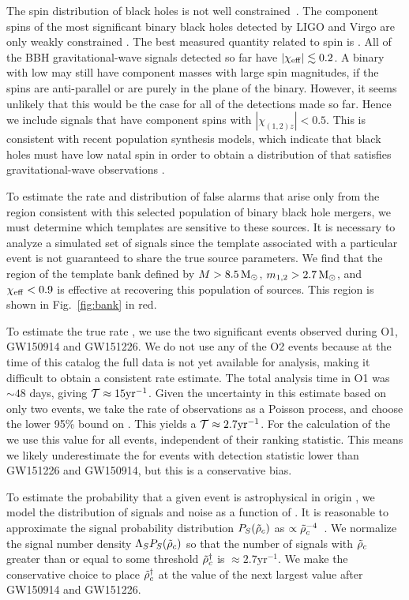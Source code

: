 The spin distribution of black holes is not well constrained~\citep{Reynolds:2013qqa}. The component spins
of the most significant binary black holes detected by LIGO and Virgo are
only weakly constrained \citep{TheLIGOScientific:2016pea}. The best measured
quantity related to spin is \chieff{}. All of the BBH gravitational-wave signals
detected so far have $|\chi_{\mathrm{eff}}| \lesssim 0.2$. A binary with
low \chieff{} may still have component masses with large spin magnitudes,
if the spins are anti-parallel or are purely in the plane of the binary.
However, it seems unlikely that this would be the case for all of the
detections made so far. Hence we include signals that have
component spins with $|\chi_{(1,2)z}| < 0.5$. This is consistent with
recent population synthesis models, which indicate that black holes
must have low natal spin in order to obtain a distribution of \chieff{}
that satisfies gravitational-wave observations \citep{Belczynski:2017gds,Wysocki:2017isg}.

To estimate the rate and distribution of false alarms that arise only
from the region consistent with this selected population of
binary black hole mergers, we must determine which templates are sensitive to these sources.
It is necessary to analyze a simulated set of signals since
the template associated with a particular event is not guaranteed to share the 
true source parameters. We find that the region of the template bank defined by
$M > 8.5\,\mathrm{M}_{\odot}$, $m_{1,2} > 2.7\,\mathrm{M}_{\odot}$, and $\chi_{\mathrm{eff}} < 0.9$ is effective at recovering
this population of sources. This region is shown in Fig.~\ref{fig:bank} in red. 

To estimate the true rate \tar{}, we use the two significant events observed
during O1, GW150914 and GW151226. We do not use any of the O2 events because at the time of this catalog the full data is
not yet available for analysis, making it difficult to obtain a consistent rate estimate. The total analysis time in O1 was $\sim48$ days, giving $\mathcal{T} \approx 15 \mathrm{yr}^{-1}$. Given the uncertainty in
this estimate based on only two events, we take the rate of observations as a Poisson process, and choose the lower
95\% bound on \tar{}. This yields a $\mathcal{T} \approx 2.7 \mathrm{yr}^{-1}$. For the calculation
of the \tdr{} we use this value for all events, independent of their ranking statistic. This means we likely underestimate the \tdr{} for events with detection statistic lower than GW151226 and GW150914, but this is a conservative bias.

To estimate the probability that a given event is astrophysical in origin \pastro{}, we model
the distribution of signals and noise as a function of \rankingstat. It is reasonable to approximate the signal
probability distribution $P_S(\tilde{\rho}_c)$ as $\propto \tilde{\rho}_c^{-4}$~\citep{Schutz:2011tw,Chen:2014yla}.
We normalize the signal number density $\Lambda_S P_S(\tilde{\rho}_c)$ so that the number of signals
with $\tilde{\rho}_c$ greater than or equal to some threshold
$\tilde{\rho}_c^{\dagger}$ is $\approx 2.7 \mathrm{yr}^{-1}$. We make the conservative choice to place
$\tilde{\rho}_c^{\dagger}$ at the value of the next largest \rankingstat{} value after GW150914 and GW151226. 

